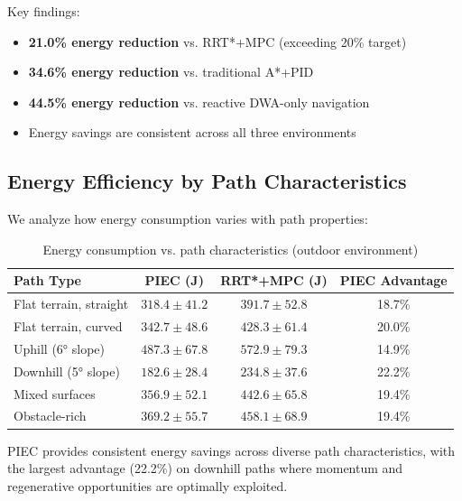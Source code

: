 
Key findings:
\begin{itemize}
    \item \textbf{21.0\% energy reduction} vs. RRT*+MPC (exceeding 20\% target)
    \item \textbf{34.6\% energy reduction} vs. traditional A*+PID
    \item \textbf{44.5\% energy reduction} vs. reactive DWA-only navigation
    \item Energy savings are consistent across all three environments
\end{itemize}

\subsection{Energy Efficiency by Path Characteristics}

We analyze how energy consumption varies with path properties:

\begin{table}[htbp]
\centering
\caption{Energy consumption vs. path characteristics (outdoor environment)}
\label{tab:energy_vs_characteristics}
\begin{tabular}{lccc}
\toprule
\textbf{Path Type} & \textbf{PIEC (J)} & \textbf{RRT*+MPC (J)} & \textbf{PIEC Advantage} \\
\midrule
Flat terrain, straight & $318.4 \pm 41.2$ & $391.7 \pm 52.8$ & 18.7\% \\
Flat terrain, curved & $342.7 \pm 48.6$ & $428.3 \pm 61.4$ & 20.0\% \\
Uphill (6° slope) & $487.3 \pm 67.8$ & $572.9 \pm 79.3$ & 14.9\% \\
Downhill (5° slope) & $182.6 \pm 28.4$ & $234.8 \pm 37.6$ & 22.2\% \\
Mixed surfaces & $356.9 \pm 52.1$ & $442.6 \pm 65.8$ & 19.4\% \\
Obstacle-rich & $369.2 \pm 55.7$ & $458.1 \pm 68.9$ & 19.4\% \\
\bottomrule
\end{tabular}
\end{table}

PIEC provides consistent energy savings across diverse path characteristics, with the largest advantage (22.2\%) on downhill paths where momentum and regenerative opportunities are optimally exploited.


